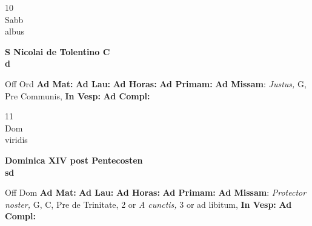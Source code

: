 \documentclass[10pt, openany]{book}
\begin{document}
        \begin{center}
            \begin{minipage}{3.5in}
                \vspace{2em}
                \begin{minipage}{0.5in}
                    {\Huge 10} \\
                    {\normalsize Sabb} \\
                    {\normalsize albus}
                \end{minipage}
                \begin{minipage}{3.0in}
                    \textbf{ \large S Nicolai de Tolentino C \\
                    \textnormal{\normalsize d}} \\ 
                \end{minipage}
                \begin{justify}Off Ord
                    \textbf{Ad Mat: }
                    \textbf{Ad Lau: }
                    \textbf{Ad Horas: }
                    \textbf{Ad Primam: }\textbf{Ad Missam}: \textit{Justus,} G, Pre Communis,  
                    \textbf{In Vesp: }
                    \textbf{Ad Compl: }
                \end{justify}
            \end{minipage}
        \end{center}
    
        \begin{center}
            \begin{minipage}{3.5in}
                \vspace{2em}
                \begin{minipage}{0.5in}
                    {\Huge 11} \\
                    {\normalsize Dom} \\
                    {\normalsize viridis}
                \end{minipage}
                \begin{minipage}{3.0in}
                    \textbf{ \large Dominica XIV post Pentecosten \\
                    \textnormal{\normalsize sd}} \\ 
                \end{minipage}
                \begin{justify}Off Dom
                    \textbf{Ad Mat: }
                    \textbf{Ad Lau: }
                    \textbf{Ad Horas: }
                    \textbf{Ad Primam: }\textbf{Ad Missam}: \textit{Protector noster,} G, C, Pre de Trinitate, 2 or \textit{A cunctis,} 3 or ad libitum,  
                    \textbf{In Vesp: }
                    \textbf{Ad Compl: }
                \end{justify}
            \end{minipage}
        \end{center}
    
\end{document}
